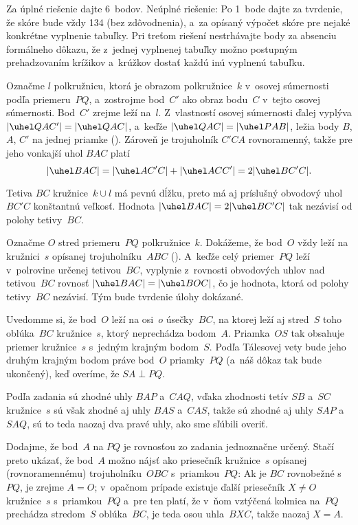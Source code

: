 {\nobreak\medskip\petit\noindent
Za úplné riešenie dajte 6~bodov.
Neúplné riešenie: Po 1~bode dajte za tvrdenie, že skóre bude vždy 134
(bez zdôvodnenia), a~za opísaný výpočet skóre pre nejaké konkrétne
vyplnenie tabuľky. Pri treťom riešení nestrhávajte body za absenciu
formálneho dôkazu, že z~jednej vyplnenej tabuľky možno postupným
prehadzovaním krížikov a~krúžkov dostať každú inú vyplnenú tabuľku.

\endpetit
\bigbreak}

{%
Označme $l$ polkružnicu, ktorá je obrazom polkružnice~$k$
v~osovej súmernosti podľa priemeru~$PQ$,
a~zostrojme bod~$C'$ ako obraz bodu~$C$ v~tejto osovej súmernosti.
Bod~$C'$ zrejme leží na~$l$. Z~vlastností osovej
súmernosti ďalej vyplýva $|\uhel QAC'|=|\uhel QAC|$, a~keďže
$|\uhel QAC|=|\uhel PAB|$, ležia body $B$, $A$,
$C'$ na jednej priamke (\obr). Zároveň je trojuholník $C'CA$ rovnoramenný, takže
pre jeho vonkajší uhol $BAC$ platí
$$
|\uhel BAC|=|\uhel AC'C|+|\uhel ACC'|=2|\uhel BC'C|.
$$

Tetiva $BC$ kružnice~$k\cup l$ má pevnú dĺžku, preto má aj príslušný obvodový
uhol~$BC'C$ konštantnú veľkosť. Hodnota $|\uhel BAC|=2 |\uhel BC'C|$
tak nezávisí od polohy tetivy~$BC$.
%

\ineres
Označme $O$ stred priemeru~$PQ$ polkružnice~$k$.
Dokážeme, že bod~$O$ vždy leží na kružnici~$s$ opísanej trojuholníku~$ABC$ (\obr).
A~keďže celý priemer~$PQ$ leží v~polrovine určenej tetivou~$BC$,
vyplynie z~rovnosti obvodových uhlov nad tetivou~$BC$ rovnosť
$|\uhel BAC|=|\uhel BOC|$, čo je hodnota, ktorá od polohy tetivy~$BC$
nezávisí. Tým bude tvrdenie úlohy dokázané.

Uvedomme si, že bod~$O$ leží na osi~$o$ úsečky~$BC$, na ktorej leží
aj stred~$S$ toho oblúka~$BC$ kružnice~$s$, ktorý neprechádza bodom~$A$.
Priamka~$OS$ tak obsahuje priemer kružnice~$s$ s~jedným
krajným bodom~$S$. Podľa Tálesovej vety bude jeho druhým krajným
bodom práve bod~$O$ priamky~$PQ$ (a~náš dôkaz tak bude ukončený),
keď overíme, že $SA\perp PQ$.

Podľa zadania sú zhodné uhly $BAP$ a~$CAQ$, vďaka zhodnosti tetív
$SB$ a~$SC$ kružnice~$s$ sú však zhodné aj uhly $BAS$ a~$CAS$,
takže sú zhodné aj uhly $SAP$ a~$SAQ$, sú to teda naozaj dva
pravé uhly, ako sme sľúbili overiť.


\poznamka
Dodajme, že bod~$A$ na $PQ$ je rovnosťou zo zadania jednoznačne určený.
Stačí preto ukázať, že bod~$A$ možno nájsť ako priesečník kružnice~$s$
opísanej (rovnoramennému) trojuholníku~$OBC$ s~priamkou~$PQ$: Ak je $BC$ rovnobežné s~$PQ$,
je zrejme $A=O$; v~opačnom prípade existuje ďalší priesečník
$X\ne O$ kružnice~$s$ s~priamkou~$PQ$ a~pre ten platí,
že v~ňom vztýčená kolmica na~$PQ$ prechádza stredom~$S$ oblúka~$BC$,
je teda osou uhla~$BXC$, takže naozaj $X=A$.


}
